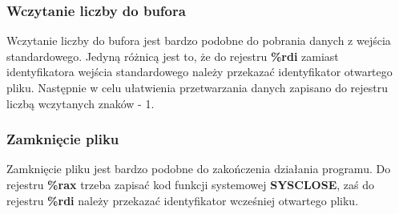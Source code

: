 \documentclass[a4paper,12pt]{article}
\begin{document}
\subsubsection{Wczytanie liczby do bufora}
Wczytanie liczby do bufora jest bardzo podobne do pobrania danych z wejścia standardowego. Jedyną różnicą jest to, że do rejestru \textbf{\%rdi} zamiast identyfikatora wejścia standardowego należy przekazać identyfikator otwartego pliku. Następnie w celu ułatwienia przetwarzania danych zapisano do rejestru liczbą wczytanych znaków - 1.
\subsubsection{Zamknięcie pliku}
Zamknięcie pliku jest bardzo podobne do zakończenia działania programu. Do rejestru \textbf{\%rax} trzeba zapisać kod funkcji systemowej \textbf{SYSCLOSE}, zaś do rejestru \textbf{\%rdi} należy przekazać identyfikator wcześniej otwartego pliku.
\end{document}
